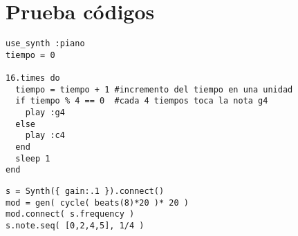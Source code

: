 \section{Prueba códigos}

\begin{lstlisting}[style={RubyStyle}, label={lst:condidion}, caption={Condición en Sonic Pi}, captionpos=b]
use_synth :piano 
tiempo = 0

16.times do
  tiempo = tiempo + 1 #incremento del tiempo en una unidad  
  if tiempo % 4 == 0  #cada 4 tiempos toca la nota g4
    play :g4
  else
    play :c4
  end
  sleep 1
end
\end{lstlisting}


\begin{lstlisting}[style={gibber}, label={lst:modulacion}, caption={Modulación de frecuencia usando \texttt{gen()} en \textit{Gibber}}, captionpos=b]
s = Synth({ gain:.1 }).connect()
mod = gen( cycle( beats(8)*20 )* 20 )
mod.connect( s.frequency )
s.note.seq( [0,2,4,5], 1/4 )
\end{lstlisting}